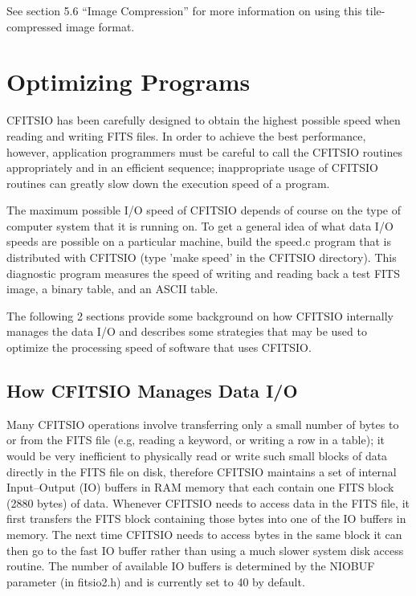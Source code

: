 \documentclass[11pt]{book}
\begin{document}
See section 5.6 ``Image Compression''
for more information on using this tile-compressed image format.

\chapter{  Optimizing Programs }

CFITSIO has been carefully designed to obtain the highest possible
speed when reading and writing FITS files.  In order to achieve the
best performance, however, application programmers must be careful to
call the CFITSIO routines appropriately and in an efficient sequence;
inappropriate usage of CFITSIO routines can greatly slow down the
execution speed of a program.

The maximum possible I/O speed of CFITSIO depends of course on the type
of computer system that it is running on.  To get a general idea of what
data I/O speeds are possible on a particular machine, build the speed.c
program that is distributed with CFITSIO (type 'make speed' in the CFITSIO
directory).  This diagnostic program measures the speed of writing and reading
back a test FITS image, a binary table, and an ASCII table.

The following 2 sections provide some background on how CFITSIO
internally manages the data I/O and describes some strategies that may
be used to optimize the processing speed of software that uses
CFITSIO.


\section{How CFITSIO Manages Data I/O}

Many CFITSIO operations involve transferring only a small number of
bytes to or from the FITS file (e.g, reading a keyword, or writing a
row in a table); it would be very inefficient to physically read or
write such small blocks of data directly in the FITS file on disk,
therefore CFITSIO maintains a set of internal Input--Output (IO)
buffers in RAM memory that each contain one FITS block (2880 bytes) of
data.  Whenever CFITSIO needs to access data in the FITS file, it first
transfers the FITS block containing those bytes into one of the IO
buffers in memory.  The next time CFITSIO needs to access bytes in the
same block it can then go to the fast IO buffer rather than using a
much slower system disk access routine.  The number of available IO
buffers is determined by the NIOBUF parameter (in fitsio2.h) and is
currently set to 40 by default.
\end{document}
